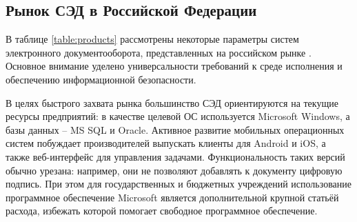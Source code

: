 \subsection{Рынок СЭД в Российской Федерации} \label{review_products}

В таблице \ref{table:products} рассмотрены некоторые параметры систем электронного документооборота, представленных на российском рынке \cite{ixbt, evfrat}. Основное внимание уделено универсальности требований к среде исполнения и обеспечению информационной безопасности.

\vspace{\baselineskip}
В целях быстрого захвата рынка большинство СЭД ориентируются на текущие ресурсы предприятий: в качестве целевой ОС используется Microsoft Windows, а базы данных – MS SQL и Oracle. Активное развитие мобильных операционных систем побуждает производителей выпускать клиенты для Android и iOS, а также веб-интерфейс для управления задачами. Функциональность таких версий обычно урезана: например, они не позволяют добавлять к документу цифровую подпись. При этом для государственных и бюджетных учреждений использование программное обеспечение Microsoft является дополнительной крупной статьёй расхода, избежать которой помогает свободное программное обеспечение.

